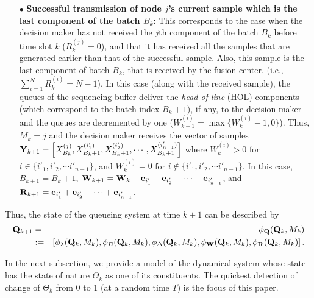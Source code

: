 \documentclass[acmtosn]{acmtrans2m}
\newcommand{\nn}{\nonumber \\}
{\theorembodyfont{\rmfamily}
\newtheorem{remarks}{Remark}[section]} \newtheorem{theorem}{Theorem}
\begin{document}
\begin{itemize}
\item[$\bullet$] {\bf Successful transmission of node $j$'s current sample which 
      is the last component of the batch $B_k$:} This corresponds to the case when 
      the decision maker has not received the $j$th component of the batch $B_k$ 
      before time slot $k$ ($R_k^{(j)} = 0$), and that it has received all the samples that are 
      generated earlier than that of the successful sample. Also, this sample is 
      the last component of batch $B_k$, that is received by the fusion center.  
      (i.e., $\sum_{i=1}^N R_k^{(i)} = N-1$). In this case (along with the 
      received sample), the queues of the sequencing buffer deliver the 
      {\em head of line} (HOL) components (which correspond to the batch index $B_k+1$), 
      if any, to the decision maker and the queues are decremented by one 
      ($W_{k+1}^{(i)} = \max\{W_k^{(i)} - 1,0\}$).   
      Thus, $M_k = j$ and the decision maker receives the 
      vector of samples ${\bf Y}_{k+1} = 
      \left[X_{B_k}^{(j)},X_{B_k+1}^{(i'_1)}, 
      X_{B_k+1}^{(i'_2)}, \cdots, X_{B_k+1}^{(i'_{n-1})}\right]$ where 
      $W_k^{(i)} > 0$ for $i \in \{i'_1,i'_2,\cdots i'_{n-1}\}$, 
      and $W_k^{(i)} = 0$ for $i \notin \{i'_1,i'_2,\cdots i'_{n-1}\}$. 
      In this case, $B_{k+1} = B_k+1$, ${\bf W}_{k+1} =
        {\bf W}_k-{\bf e}_{i_1'}-{\bf e}_{i_2'}-\cdots-{\bf e}_{i_{n-1}'}$,
          and ${\bf R}_{k+1} = {\bf e}_{i_1'}+{\bf
e}_{i_2'}+\cdots+{\bf e}_{i_{n-1}'}$.  
\end{itemize}
Thus, the state of the queueing system at time $k+1$ can be described by 
\begin{eqnarray*}
{\bf Q}_{k+1} & = & \phi_{\bf Q}({\bf Q}_k,M_k)\nn 
             & := & 
 \left[\phi_{\lambda}({\bf Q}_k,M_k),
 \phi_{B}({\bf Q}_k,M_k),
 \phi_{\Delta}({\bf Q}_k,M_k),
 \phi_{\bf W}({\bf Q}_k,M_k),
 \phi_{\bf R}({\bf Q}_k,M_k)\right].
\end{eqnarray*}


In the next subsection, we provide a model of the dynamical system whose
state has the state of nature $\Theta_k$ as one of its constituents. The
quickest detection of change of $\Theta_k$ from 0 to 1 (at a random
time $T$) is the focus of this paper.
 
\end{document}
